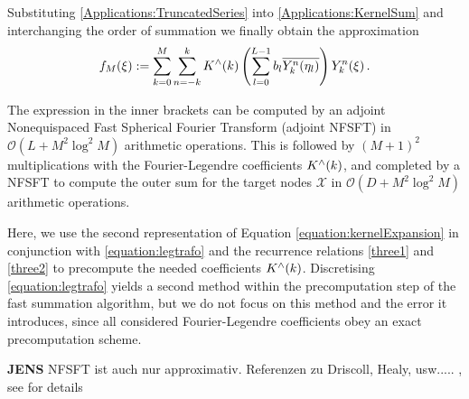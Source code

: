 \documentclass[11pt,a4paper,twoside,bibtotoc]{scrartcl}
\theoremstyle{plain}
\theoremstyle{definition}
\theoremstyle{remark}
\newcommand{\fun}[2]{\ensuremath{#1{\hspace{-0.4ex}}\left(#2\right)}}
\newcommand{\paren}[1]{\ensuremath{\left(#1\right)}}
\newcommand{\mb}[1]{\mathbf{#1}}
\newcommand{\V}[1]{\mb{#1}}
\numberwithin{equation}{section}
\numberwithin{table}{section}
\numberwithin{figure}{section}
\begin{document}
Substituting \eqref{Applications:TruncatedSeries} into
\eqref{Applications:KernelSum} and interchanging the order of summation we
finally obtain the approximation
\[
  \fun{f_{M}}{\xi} := \sum_{k=0}^{M} \sum_{n=-k}^k \fun{K^{\wedge}}{k}
  \paren{\sum_{l = 0}^{L-1} b_{l} \overline{\fun{Y_{k}^n}{\V{\eta}_{l}}}}
  \fun{Y_{k}^n}{\V{\xi}}.
\]

The expression in the inner brackets can be computed by an adjoint
Nonequispaced Fast Spherical Fourier Transform (adjoint NFSFT) in
$\mathcal{O}(L + M^2 \log^2 M)$ arithmetic operations.
This is followed by $(M+1)^2$ multiplications with the Fourier-Legendre
coefficients $\fun{K^{\wedge}}{k}$, and completed by a NFSFT to compute the
outer sum for the target nodes $\mathcal{X}$ in $\mathcal{O}(D + M^2 \log^2
M)$ arithmetic operations.

Here, we use the second representation of Equation
\eqref{equation:kernelExpansion} in conjunction with \eqref{equation:legtrafo}
and the recurrence relations \eqref{three1} and \eqref{three2} to precompute
the needed coefficients $\fun{K^{\wedge}}{k}$.
Discretising \eqref{equation:legtrafo} yields a second method within the
precomputation step of the fast summation algorithm, but we do not focus on
this method and the error it introduces, since all considered Fourier-Legendre
coefficients obey an exact precomputation scheme.

{\bf JENS}
  NFSFT ist auch nur approximativ. Referenzen zu Driscoll, Healy, usw..... 
, see \cite{kupo02, keiner05} for details
\end{document}
